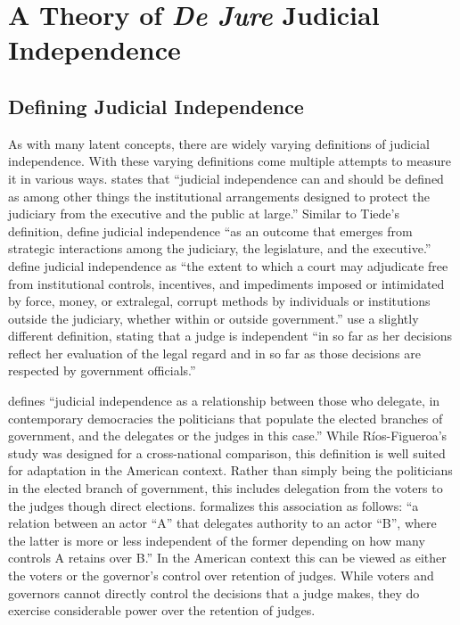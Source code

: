 \documentclass[12pt]{article}
\begin{document}
\section*{A Theory of \textit{De Jure} Judicial Independence}
\subsection*{Defining Judicial Independence}%
As with many latent concepts, there are widely varying definitions of judicial independence.  With these varying definitions come multiple attempts to measure it in various ways.  \citet[131]{Tiede2006} states that ``judicial independence can and should be defined as among other things the institutional arrangements designed to protect the judiciary from the executive and the public at large.''  Similar to Tiede's definition, \citet[108]{McNollgast2006} define judicial independence ``as an outcome that emerges from strategic interactions among the judiciary, the legislature, and the executive.''  \citet[286]{Howard2004} define judicial independence as ``the extent to which a court may adjudicate free from institutional controls, incentives, and impediments imposed or intimidated by force, money, or extralegal, corrupt methods by individuals or institutions outside the judiciary, whether within or outside government.''  \citet[4]{Linzer2014} use a slightly different definition, stating that a judge is independent ``in so far as her decisions reflect her evaluation of the legal regard and in so far as those decisions are respected by government officials.''

\citet[6]{Rios2006} defines ``judicial independence as a relationship between those who delegate, in contemporary democracies the politicians that populate the elected branches of government, and the delegates or the judges in this case.''   While R\'{i}os-Figueroa's study was designed for a cross-national comparison, this definition is well suited for adaptation in the American context.  Rather than simply being the politicians in the elected branch of government, this includes delegation from the voters to the judges though direct elections.  \citet[17]{Rios2006} formalizes this association as follows: ``a relation between an actor ``A'' that delegates authority to an actor ``B'', where the latter is more or less independent of the former depending on how many controls A retains over B.''  In the American context this can be viewed as either the voters or the governor's control over retention of judges.  While voters and governors cannot directly control the decisions that a judge makes, they do exercise considerable power over the retention of judges.  
\end{document}
